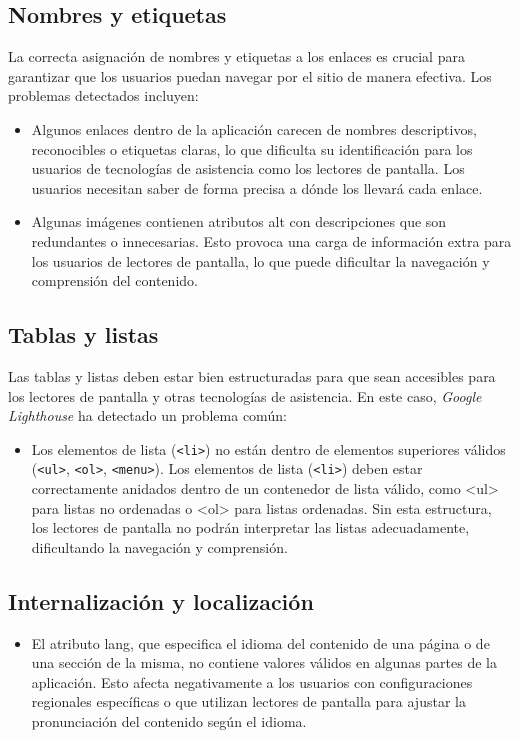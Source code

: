 \documentclass[]{article}
\begin{document}
\subsection*{Nombres y etiquetas}
La correcta asignación de nombres y etiquetas a los enlaces es crucial para garantizar que los usuarios puedan navegar por el sitio de manera efectiva. Los problemas detectados incluyen:
\begin{itemize}
	\item Algunos enlaces dentro de la aplicación carecen de nombres descriptivos, reconocibles o etiquetas claras, lo que dificulta su identificación para los usuarios de tecnologías de asistencia como los lectores de pantalla. Los usuarios necesitan saber de forma precisa a dónde los llevará cada enlace. 
	\item Algunas imágenes contienen atributos alt con descripciones que son redundantes o innecesarias. Esto provoca una carga de información extra para los usuarios de lectores de pantalla, lo que puede dificultar la navegación y comprensión del contenido.
\end{itemize}

\subsection*{Tablas y listas}
Las tablas y listas deben estar bien estructuradas para que sean accesibles para los lectores de pantalla y otras tecnologías de asistencia. En este caso, \textit{Google Lighthouse} ha detectado un problema común:
\begin{itemize}
	\item Los elementos de lista (\texttt{<li>}) no están dentro de elementos superiores válidos (\texttt{<ul>}, \texttt{<ol>}, \texttt{<menu>}). Los elementos de lista (\texttt{<li>}) deben estar correctamente anidados dentro de un contenedor de lista válido, como <ul> para listas no ordenadas o <ol> para listas ordenadas. Sin esta estructura, los lectores de pantalla no podrán interpretar las listas adecuadamente, dificultando la navegación y comprensión.
\end{itemize}

\subsection*{Internalización y localización}
\begin{itemize}
	\item El atributo lang, que especifica el idioma del contenido de una página o de una sección de la misma, no contiene valores válidos en algunas partes de la aplicación. Esto afecta negativamente a los usuarios con configuraciones regionales específicas o que utilizan lectores de pantalla para ajustar la pronunciación del contenido según el idioma.
\end{itemize}
\end{document}
